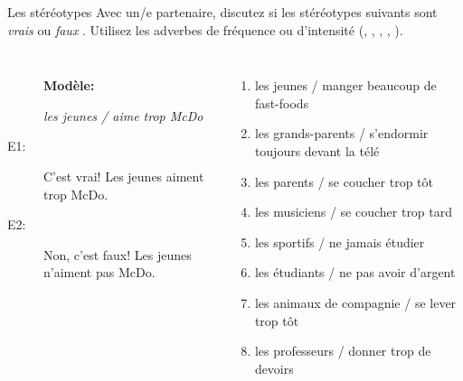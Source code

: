 \documentclass{beamer}
\begin{document}
  \begin{frame}{Les stéréotypes }
    Avec un/e partenaire, discutez si les stéréotypes suivants sont \emph{vrais}  ou \emph{faux} .
    Utilisez les adverbes de fréquence ou d'intensité (, , , , ). \\
    \begin{columns}[t]
        \scriptsize
        \begin{description}
          \item[] \textbf{Modèle:}
          \item[] \emph{les jeunes / aime trop McDo}
          \item[E1:] C'est vrai! Les jeunes aiment trop McDo.
          \item[] 
          \item[E2:] Non, c'est faux! Les jeunes n'aiment pas McDo.
          \item[] 
        \end{description}
        \scriptsize
        \begin{enumerate}
          \item les jeunes / manger beaucoup de fast-foods
          \item les grands-parents / s'endormir toujours devant la télé
          \item les parents / se coucher trop tôt
          \item les musiciens / se coucher trop tard
          \item les sportifs / ne jamais étudier
          \item les étudiants / ne pas avoir d'argent
          \item les animaux de compagnie / se lever trop tôt
          \item les professeurs / donner trop de devoirs
        \end{enumerate}
    \end{columns}
  \end{frame}
\end{document}
